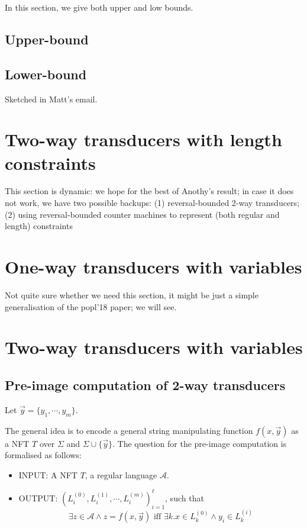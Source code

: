 \documentclass{llncs}
\begin{document}
In this section, we give both upper and low bounds. 

\subsection{Upper-bound}

\subsection{Lower-bound}

Sketched in Matt's email. 


\section{Two-way transducers with length constraints}

This section is dynamic: we hope for the best of Anothy's result; in case it does not work, we have two possible backups: (1) reversal-bounded 2-way transducers; (2) using reversal-bounded counter machines to represent (both regular and length) constraints


\section{One-way transducers with variables}

Not quite sure whether we need this section, it might be just a simple generalisation of the popl'18 paper; we will see. 


\section{Two-way transducers with variables}

\subsection{Pre-image computation of 2-way transducers}  

Let $\vec{y}=\{y_1, \cdots, y_m\}$.

The general idea is to encode a general string manipulating function $f(x, \vec{y})$ as a NFT $T$ over $\Sigma$ and $\Sigma\cup\{\vec{y}\}$. The question for the pre-image computation is formalised as follows:
\begin{itemize}
	\item INPUT: A NFT $T$, a regular language $\mathcal{A}$. 
	\item OUTPUT: $(L^{(0)}_i, L^{(1)}_i, \cdots, L^{(m)}_i )_{i=1}^\ell$, such that 
	\[\exists z\in\mathcal{A} \wedge z=f(x, \vec{y})\mbox{ iff }\exists k. x\in L^{(0)}_k \wedge y_i\in L^{(i)}_k \]
\end{itemize}
\end{document}

